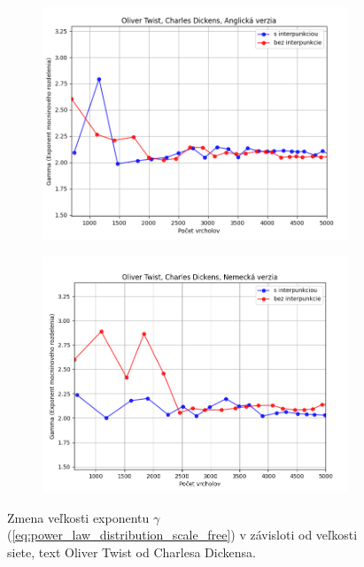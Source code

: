\begin{figure}[htbp]
    \centering
    \begin{subfigure}[b]{0.9\textwidth}
        \includegraphics[width=\textwidth]{images/Growth/Screenshot_17.png}
    \end{subfigure}

    \vspace{0.3cm}

    \begin{subfigure}[b]{0.9\textwidth}
        \includegraphics[width=\textwidth]{images/Growth/Screenshot_18.png}
    \end{subfigure}
    
    \vspace{0.3cm}
    \caption{Zmena veľkosti exponentu $\gamma$ (\ref{eq:power_law_distribution_scale_free}) v závisloti od veľkosti siete, text Oliver Twist od Charlesa Dickensa.}\label{fig:growthTwist}
\end{figure}

